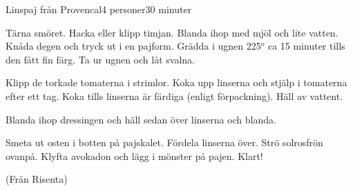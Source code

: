 \documentclass[a4wide, 10pt]{article}
\begin{document}
\begin{recipe}{Linspaj från Provencal}{4 personer}{30 minuter}


Tärna smöret. Hacka eller klipp timjan. Blanda ihop med mjöl och lite vatten.
Knåda degen och tryck ut i en pajform. Grädda i ugnen 225$^o$ ca 15 minuter tills
den fått fin färg. Ta ur ugnen och låt svalna.


Klipp de torkade tomaterna i strimlor. Koka upp linserna och stjälp i tomaterna
efter ett tag. Koka tills linserna är färdiga (enligt förpackning). Häll av vattent.


Blanda ihop dressingen och häll sedan över linserna och blanda.


Smeta ut osten i botten på pajskalet. Fördela linserna över. Strö solrosfrön
ovanpå. Klyfta avokadon och lägg i mönster på pajen. Klart!

\end{recipe}

(Från Risenta)
\end{document}
